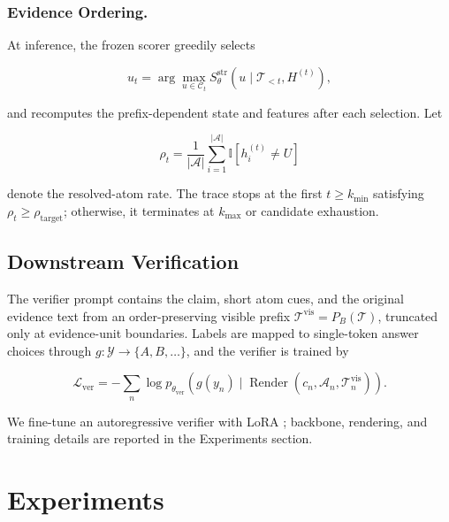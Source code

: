 \documentclass[letterpaper]{article}
\begin{document}
\subsubsection{Evidence Ordering.}

At inference, the frozen scorer greedily selects

\[
u_t=\arg\max_{u\in\mathcal C_t}
S_\theta^{\mathrm{str}}
(u\mid\mathcal T_{<t},H^{(t)}),
\]

and recomputes the prefix-dependent state and features after each
selection. Let

\[
\rho_t=
\frac{1}{|\mathcal A|}
\sum_{i=1}^{|\mathcal A|}
\mathbb I[h_i^{(t)}\ne U]
\]

denote the resolved-atom rate. The trace stops at the first
$t\ge k_{\min}$ satisfying
$\rho_t\ge\rho_{\mathrm{target}}$; otherwise, it terminates at
$k_{\max}$ or candidate exhaustion.

\subsection{Downstream Verification}

The verifier prompt contains the claim, short atom cues, and the
original evidence text from an order-preserving visible prefix
$\mathcal T^{\mathrm{vis}}=P_B(\mathcal T)$, truncated only at
evidence-unit boundaries. Labels are mapped to single-token answer
choices through
$g:\mathcal Y\rightarrow\{A,B,\ldots\}$, and the verifier is trained by

\[
\mathcal L_{\mathrm{ver}}
=-\sum_n
\log p_{\theta_{\mathrm{ver}}}
\left(
g(y_n)\mid
\operatorname{Render}
(c_n,\mathcal A_n,\mathcal T_n^{\mathrm{vis}})
\right).
\]

We fine-tune an autoregressive verifier with LoRA
\citep{Hu2022LoRA}; backbone, rendering, and training details are
reported in the Experiments section.

\section{Experiments}
\end{document}
